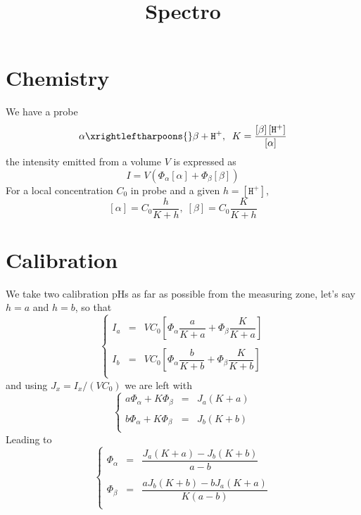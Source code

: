 \documentclass[aps]{revtex4}
\newcommand{\mychem}[1]{\mathtt{#1}}
\newcommand{\myconc}[1]{\left\lbrack{#1}\right\rbrack}
\newcommand{\plus}{\mychem{+}}
\newcommand{\proton}{\mychem{H}^\plus}
\begin{document}
\title{Spectro}
\maketitle

\section{Chemistry}

We have a probe
\begin{equation}
	\alpha \xrightleftharpoons{} \beta + \proton, \;\; K = \dfrac{\myconc{\beta}\myconc{\proton}}{ \myconc{\alpha} }
\end{equation}
the intensity emitted from a volume $V$ is expressed as
\begin{equation}
	I = V \left( \Phi_\alpha \myconc{\alpha}  + \Phi_\beta \myconc{\beta} \right)
\end{equation}
For a local concentration $C_0$ in probe and a given $h=\myconc{\proton}$,
\begin{equation}
	 \myconc{\alpha}  = C_0 \dfrac{h}{K+h},\; \myconc{\beta} = C_0 \dfrac{K}{K+h}
\end{equation}

\section{Calibration}
We take two calibration pHs as far as possible from the measuring zone, let's say $h=a$ and $h=b$, so that
\begin{equation}
\left\lbrace
\displaystyle
\begin{array}{rcl}
	I_a & = & V C_0 \left[  \Phi_\alpha \dfrac{a}{K+a} + \Phi_\beta \dfrac{K}{K+a}\right]\\
	\\
	I_b & = & V C_0 \left[  \Phi_\alpha \dfrac{b}{K+b} + \Phi_\beta \dfrac{K}{K+b}\right]\\
\end{array}
\right.
\end{equation}
and using $J_x=I_x/(VC_0)$ we are left with
\begin{equation}
\left\lbrace
\displaystyle
	\begin{array}{rcl}
	a \Phi_\alpha + K \Phi_\beta & = & J_a(K+a)\\
	\\
	b \Phi_\alpha + K \Phi_\beta & = & J_b(K+b)\\
	\end{array}
\right.
\end{equation}
Leading to
\begin{equation}
\left\lbrace
\displaystyle
	\begin{array}{rcl}
	\Phi_\alpha & = & \dfrac{J_a(K+a)-J_b(K+b)}{a-b}\\
	\\
	\Phi_\beta & = & \dfrac{aJ_b(K+b)-bJ_a(K+a)}{K(a-b)}\\
	\end{array}
\right.
\end{equation}
\end{document}
